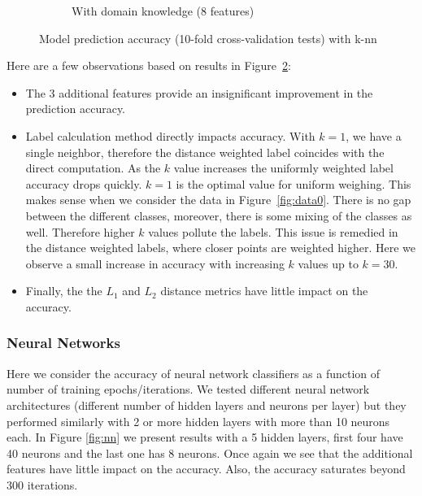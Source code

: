 \documentclass{article}
\begin{document}
\begin{figure}[h!]
\begin{subfigure}[b]{0.45\textwidth}
        \caption{With domain knowledge (8  features)}
        \label{fig:tiger}
    \end{subfigure}
    \caption{Model prediction accuracy (10-fold cross-validation tests) with k-nn}\label{fig:knn}
\end{figure}

Here are a few observations based on results in Figure~\ref{fig:knn}:
\begin{itemize}
\item The 3 additional features provide an insignificant improvement in the prediction accuracy.
\item Label calculation method directly impacts accuracy.
\subitem With $k=1$, we have a single neighbor, therefore the distance weighted label coincides with the direct computation. 
\subitem As the $k$ value increases the uniformly weighted label accuracy drops quickly. $k=1$ is the optimal value for uniform weighing. This makes sense when we consider the data in Figure~\ref{fig:data0}. There is no gap between the different classes, moreover, there is some mixing of the classes as well. Therefore higher $k$ values pollute the labels.
\subitem This issue is remedied in the distance weighted labels, where closer points are weighted higher. Here we observe a small increase in accuracy with increasing $k$ values up to $k=30$.
\item Finally, the the $L_1$ and $L_2$ distance metrics have little impact on the accuracy.
\end{itemize}

\subsubsection{Neural Networks}
Here we consider the accuracy of neural network classifiers as a function of number of training epochs/iterations. We tested different neural network architectures (different number of hidden layers and neurons per layer) but they performed similarly with 2 or more hidden layers with more than 10 neurons each. In Figure \ref{fig:nn} we present results with a 5 hidden layers, first four have 40 neurons and the last one has 8 neurons. Once again we see that the additional features have little impact on the accuracy. Also, the accuracy saturates beyond 300 iterations.
\end{document}
